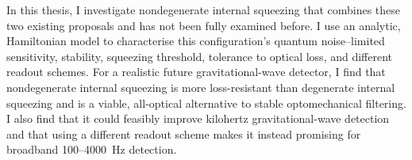 In this thesis, I investigate nondegenerate internal squeezing that combines these two existing proposals and has not been fully examined before.
I use an analytic, Hamiltonian model to characterise this configuration's quantum noise--limited sensitivity, stability, squeezing threshold, tolerance to optical loss, and different readout schemes. For a realistic future gravitational-wave detector, I find that nondegenerate internal squeezing is more loss-resistant than degenerate internal squeezing and is a viable, all-optical alternative to stable optomechanical filtering. I also find that it could feasibly improve kilohertz gravitational-wave detection and that using a different readout scheme makes it instead promising for broadband 100--4000~Hz detection. 


